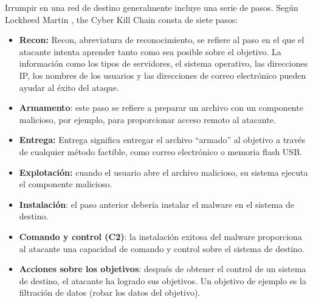 Irrumpir en una red de destino generalmente incluye una serie de pasos. Según Lockheed Martin , the Cyber Kill Chain consta de siete pasos: 
\begin{itemize}
    \item \textbf{Recon:} Recon, abreviatura de reconocimiento, se refiere al paso en el que el atacante intenta aprender tanto como sea posible sobre el objetivo. La información como los tipos de servidores, el sistema operativo, las direcciones IP, los nombres de los usuarios y las direcciones de correo electrónico pueden ayudar al éxito del ataque. 
    \item \textbf{Armamento}: este paso se refiere a preparar un archivo con un componente malicioso, por ejemplo, para proporcionar acceso remoto al atacante. 
    \item \textbf{Entrega:} Entrega significa entregar el archivo ``armado'' al objetivo a través de cualquier método factible, como correo electrónico o memoria flash USB. 
    \item \textbf{Explotación:} cuando el usuario abre el archivo malicioso, su sistema ejecuta el componente malicioso. 
    \item \textbf{Instalación}: el paso anterior debería instalar el malware en el sistema de destino. 
    \item \textbf{Comando y control (C2)}: la instalación exitosa del malware proporciona al atacante una capacidad de comando y control sobre el sistema de destino. 
    \item \textbf{Acciones sobre los objetivos}: después de obtener el control de un sistema de destino, el atacante ha logrado sus objetivos. Un objetivo de ejemplo es la filtración de datos (robar los datos del objetivo).


\end{itemize}



